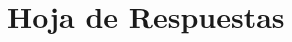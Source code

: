 
\onecolumn
\setlength{\headsep}{-80pt}
\chapter{Hoja de Respuestas}

\newcommand*\mycirc[1]{%
  \begin{tikzpicture}
    \node[draw,circle,inner sep=1pt,minimum width=.5cm]  (bigc) {#1};
  \end{tikzpicture}}



\renewcommand{\arraystretch}{2.}

